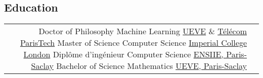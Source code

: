 \documentclass[10pt]{article} %
\begin{document}
\begin{paracol}{2}
\section{Education}
%
%
%
%
%
\begin{supertabular}{rl} %
%
%
    {Doctor of Philosophy} %
    {} %
    {Machine Learning} %
    {\href{https://www.ibisc.univ-evry.fr/}{UEVE} \&
     \href{https://ltci.telecom-paristech.fr/}{T\'el\'ecom ParisTech}}
%
%
    {Master of Science} %
    {} %
    {Computer Science} %
    {\href{http://www.imperial.ac.uk/computing}{Imperial College London}} %
%
%
    {Dipl\^ome d'ing\'enieur} %
    {} %
    {Computer Science} %
    {\href{http://www.ensiie.fr/}{ENSIIE, Paris-Saclay}}
%
%
    {Bachelor of Science} %
    {} %
    {Mathematics} %
    {\href{https://www.univ-evry.fr/accueil.html}{UEVE, Paris-Saclay}}
%
%
\end{supertabular}
%
%

\end{paracol}
\end{document}
